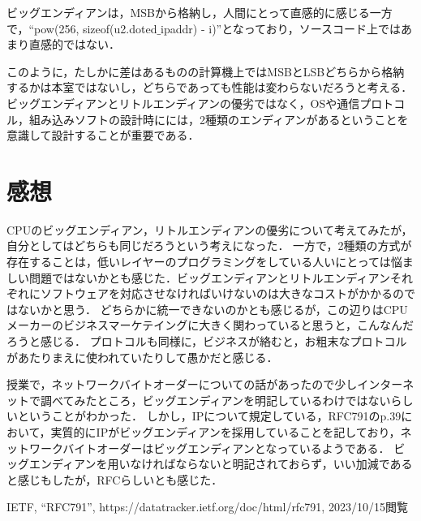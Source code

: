 \documentclass[a4paper,dvipdfmx]{jsarticle}
\begin{document}
ビッグエンディアンは，MSBから格納し，人間にとって直感的に感じる一方で，``pow(256, sizeof(u2.doted$\_$ipaddr) - i)''となっており，ソースコード上ではあまり直感的ではない．

このように，たしかに差はあるものの計算機上ではMSBとLSBどちらから格納するかは本室ではないし，どちらであっても性能は変わらないだろうと考える．
ビッグエンディアンとリトルエンディアンの優劣ではなく，OSや通信プロトコル，組み込みソフトの設計時にには，2種類のエンディアンがあるということを意識して設計することが重要である．

\section{感想}
CPUのビッグエンディアン，リトルエンディアンの優劣について考えてみたが，自分としてはどちらも同じだろうという考えになった．
一方で，2種類の方式が存在することは，低いレイヤーのプログラミングをしている人いにとっては悩ましい問題ではないかとも感じた．ビッグエンディアンとリトルエンディアンそれぞれにソフトウェアを対応させなければいけないのは大きなコストがかかるのではないかと思う．
どちらかに統一できないのかとも感じるが，この辺りはCPUメーカーのビジネスマーケテイングに大きく関わっていると思うと，こんなんだろうと感じる．
プロトコルも同様に，ビジネスが絡むと，お粗末なプロトコルがあたりまえに使われていたりして愚かだと感じる．

授業で，ネットワークバイトオーダーについての話があったので少しインターネットで調べてみたところ，ビッグエンディアンを明記しているわけではないらしいということがわかった．
しかし，IPについて規定している，RFC791\cite{bib:rfc791}のp.39において，実質的にIPがビッグエンディアンを採用していることを記しており，ネットワークバイトオーダーはビッグエンディアンとなっているようである．
ビッグエンディアンを用いなければならないと明記されておらず，いい加減であると感じもしたが，RFCらしいとも感じた．

\begin{thebibliography}{9}
  IETF, ``RFC791'', https://datatracker.ietf.org/doc/html/rfc791, 2023/10/15閲覧
  
\end{thebibliography}
\end{document}
